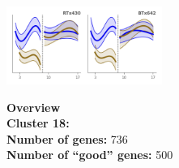 \begin{multicols}{2}
\includegraphics[width=2in]{figures/clusters/root_Preflowering_17.png}
\columnbreak

\noindent \textbf{Overview}\\\textbf{Cluster 18:}  \\
\textbf{Number of genes:} 736 \\
\textbf{Number of ``good'' genes:} 500 \\
\end{multicols}

